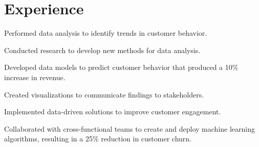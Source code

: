\documentclass[]{plushcv}
\begin{document}
\begin{minipage}[t]{0.70\textwidth} 


\sectionsep

\section{Experience}



\begin{tightemize}
\sectionsep
\sectionsep
\item Performed data analysis to identify trends in customer behavior.
\item Conducted research to develop new methods for data analysis.
\item Developed data models to predict customer behavior that produced a 10\% increase in revenue.
\item Created visualizations to communicate findings to stakeholders.
\item Implemented data-driven solutions to improve customer engagement.
\item Collaborated with cross-functional teams to create and deploy machine learning algorithms, resulting in a 25\% reduction in customer churn.


\end{tightemize}
\sectionsep


\end{minipage}
\end{document}
